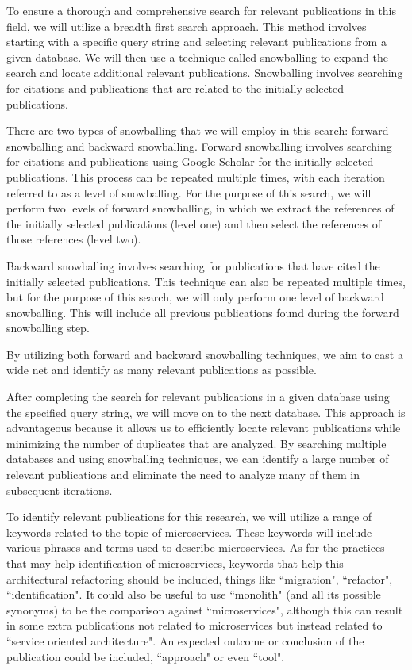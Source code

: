 \documentclass[conference]{IEEEtran}
\begin{document}

To ensure a thorough and comprehensive search for relevant publications in this
field, we will utilize a breadth first search approach. This method involves
starting with a specific query string and selecting relevant publications from
a given database. We will then use a technique called snowballing to expand the
search and locate additional relevant publications. Snowballing involves
searching for citations and publications that are related to the initially
selected publications.

There are two types of snowballing that we will employ in this search: forward
snowballing and backward snowballing. Forward snowballing involves searching
for citations and publications using Google Scholar for the initially selected
publications. This process can be repeated multiple times, with each iteration
referred to as a level of snowballing. For the purpose of this search, we will
perform two levels of forward snowballing, in which we extract the references
of the initially selected publications (level one) and then select the
references of those references (level two).

Backward snowballing involves searching for publications that have cited the
initially selected publications. This technique can also be repeated multiple
times, but for the purpose of this search, we will only perform one level of
backward snowballing. This will include all previous publications found during
the forward snowballing step.

By utilizing both forward and backward snowballing techniques, we aim to cast a
wide net and identify as many relevant publications as possible.

After completing the search for relevant publications in a given database using
the specified query string, we will move on to the next database. This approach
is advantageous because it allows us to efficiently locate relevant
publications while minimizing the number of duplicates that are analyzed. By
searching multiple databases and using snowballing techniques, we can identify
a large number of relevant publications and eliminate the need to analyze many
of them in subsequent iterations.

To identify relevant publications for this research, we will utilize a range of
keywords related to the topic of microservices. These keywords will include
various phrases and terms used to describe microservices. As for the practices
that may help identification of microservices, keywords that help this
architectural refactoring should be included, things like ``migration",
``refactor", ``identification". It could also be useful to use ``monolith" (and
all its possible synonyms) to be the comparison against ``microservices",
although this can result in some extra publications not related to
microservices but instead related to ``service oriented architecture". An
expected outcome or conclusion of the publication could be included,
``approach" or even ``tool".
\end{document}
